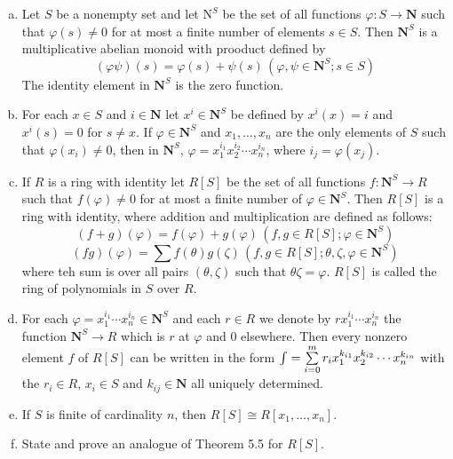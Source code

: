 \begin{ex}
    \begin{enumerate}[(a)]
        \item Let $S$ be a nonempty set and let $\mathrm{N}^{S}$ be the set of all functions $\varphi:S\to \mathbf{N}$ such that $\varphi(s)\neq 0$ for at most a finite number of elements $s\in S$. Then $\mathbf{N}^{S}$ is a multiplicative abelian monoid with prooduct defined by \[(\varphi \psi)(s)=\varphi(s)+\psi(s)\, (\varphi,\psi\in \mathbf{N}^{S};s\in S)\]The identity element in $\mathbf{N}^{S}$ is the zero function.
        \item For each $x\in S$ and $i\in \mathbf{N}$ let $x^{i}\in \mathbf{N}^{S}$ be defined by $x^{i}(x)=i$ and $x^{i}(s)=0$ for $s\neq x$. If $\varphi\in\mathbf{N}^{S}$ and $x_{1},\dots,x_{n}$ are the only elements of $S$ such that $\varphi(x_{i})\neq 0$, then in $\mathbf{N}^{S}$, $\varphi=x_{1}^{i_{1}}x_{2}^{i_{2}}\cdots x_{n}^{i_{n}}$, where $i_{j}=\varphi(x_{j})$.
        \item If $R$ is a ring with identity let $R[S]$ be the set of all functions $f:\mathbf{N}^{S}\to R$ such that $f(\varphi)\neq 0$ for at most a finite number of $\varphi\in \mathbf{N}^{S}$. Then $R[S]$ is a ring with identity, where addition and multiplication are defined as follows:\[(f+g)(\varphi)=f(\varphi)+g(\varphi)\,(f,g\in R[S];\varphi\in \mathbf{N}^{S})\]\[(fg)(\varphi)=\sum f(\theta)g(\zeta)\,(f,g\in R[S]; \theta,\zeta,\varphi\in \mathbf{N}^{S})\] where teh sum is over all pairs $(\theta,\zeta)$ such that $\theta \zeta=\varphi$. $R[S]$ is called the ring of polynomials in $S$ over $R$.
        \item For each $\varphi=x_{1}^{i_{1}}\cdots x_{n}^{i_{n}}\in \mathbf{N}^{S}$ and each $r\in R$ we denote by $rx_{1}^{i_{1}}\cdots x_{n}^{i_{n}}$ the function $\mathbf{N}^{S}\to R$ which is $r$ at $\varphi$ and 0 elsewhere. Then every nonzero element $f$ of $R[S]$ can be written in the form $\int =\sum\limits_{i=0}^{m}r_{i}x_{1}^{k_{i1}}x_{2}^{k_{i2}}\\\cdots x_{n}^{k_{in}}$ with the $r_{i}\in R$, $x_{i}\in S$ and $k_{ij}\in\mathbf{N}$ all uniquely determined.
        \item If $S$ is finite of cardinality $n$, then $R[S]\cong R[x_{1},\dots,x_{n}]$.
        \item State and prove an analogue of Theorem 5.5 for $R[S]$.
    \end{enumerate}
\end{ex}

$$ $$

